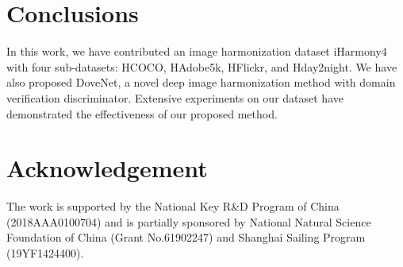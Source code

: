 \documentclass[10pt,twocolumn,letterpaper]{article}
\begin{document}
\section{Conclusions}
In this work, we have contributed an image harmonization dataset iHarmony4 with four sub-datasets: HCOCO, HAdobe5k, HFlickr, and Hday2night. We have also proposed DoveNet, a novel deep image harmonization method with domain verification discriminator. Extensive experiments on our dataset have demonstrated the effectiveness of our proposed method.

\section*{Acknowledgement}
The work is supported by the National Key R\&D Program of China (2018AAA0100704) and is partially sponsored by National Natural Science Foundation of China (Grant No.61902247) and Shanghai Sailing Program (19YF1424400).
\end{document}
